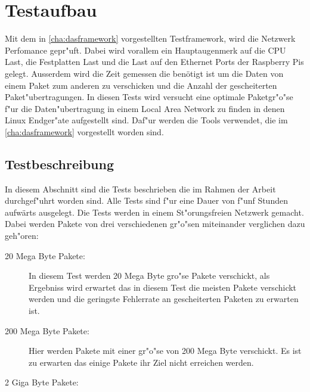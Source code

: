 \chapter{Testaufbau}
\label{cha:testaufbau}
Mit dem in \cref{cha:dasframework} vorgestellten Testframework, wird die Netzwerk Perfomance gepr"uft. %
Dabei wird vorallem ein Hauptaugenmerk auf die CPU Last, die Festplatten Last und die Last auf den %
Ethernet Ports der Raspberry Pis gelegt. Ausserdem wird die Zeit gemessen die benötigt ist um %
die Daten von einem Paket zum anderen zu verschicken und die Anzahl der gescheiterten Paket"ubertragungen. %
In diesen Tests wird versucht eine optimale Paketgr"o"se f"ur die Daten"ubertragung in einem %
Local Area Network zu finden in denen Linux Endger"ate aufgestellt sind. Daf"ur werden die Tools verwendet, %
die im \cref{cha:dasframework} vorgestellt worden sind.

\section{Testbeschreibung}
\label{sec:testbeschreibung}
In diesem Abschnitt sind die Tests beschrieben die im Rahmen der Arbeit durchgef"uhrt worden sind. %
Alle Tests sind f"ur eine Dauer von f"unf Stunden aufwärts ausgelegt. Die Tests werden in einem %
St"orungsfreien Netzwerk gemacht. Dabei werden Pakete von drei verschiedenen gr"o"sen miteinander %
verglichen dazu geh"oren:  
\begin{description}
\item[20 Mega Byte Pakete: ]In diesem Test werden 20 Mega Byte gro"se Pakete verschickt, als Ergebniss %
wird erwartet das in diesem Test die meisten Pakete verschickt werden und die geringste Fehlerrate an %
gescheiterten Paketen zu erwarten ist. 
\item[200 Mega Byte Pakete: ]Hier werden Pakete mit einer gr"o"se von 200 Mega Byte verschickt. Es %
ist zu erwarten das einige Pakete ihr Ziel nicht erreichen werden. 
\item[2 Giga Byte Pakete: ]
\end{description}
